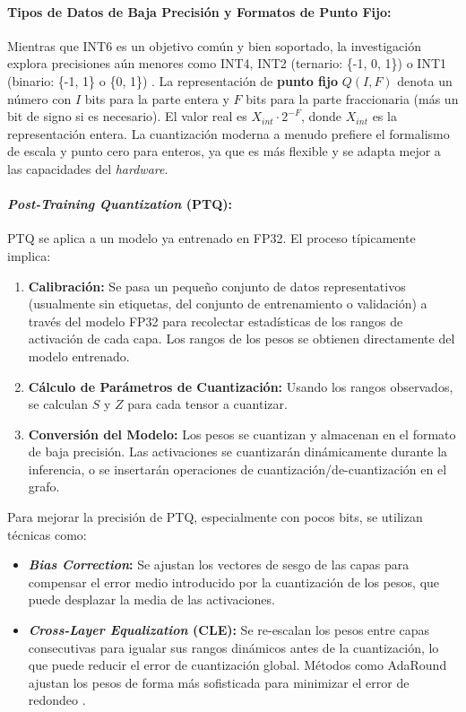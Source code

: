 \documentclass[12pt]{article}
\begin{document}
\paragraph{Tipos de Datos de Baja Precisión y Formatos de Punto Fijo:}
Mientras que INT6 es un objetivo común y bien soportado, la investigación explora precisiones aún menores como INT4, INT2 (ternario: \{-1, 0, 1\}) o INT1 (binario: \{-1, 1\} o \{0, 1\}) \cite{LiX2021RobustnessAware}. La representación de \textbf{punto fijo} $Q(I,F)$ denota un número con $I$ bits para la parte entera y $F$ bits para la parte fraccionaria (más un bit de signo si es necesario). El valor real es $X_{int} \cdot 2^{-F}$, donde $X_{int}$ es la representación entera. La cuantización moderna a menudo prefiere el formalismo de escala y punto cero para enteros, ya que es más flexible y se adapta mejor a las capacidades del \textit{hardware}.

\paragraph{\textit{Post-Training Quantization} (PTQ):}
PTQ se aplica a un modelo ya entrenado en FP32. El proceso típicamente implica:
\begin{enumerate}
    \item \textbf{Calibración:} Se pasa un pequeño conjunto de datos representativos (usualmente sin etiquetas, del conjunto de entrenamiento o validación) a través del modelo FP32 para recolectar estadísticas de los rangos de activación de cada capa. Los rangos de los pesos se obtienen directamente del modelo entrenado.
    \item \textbf{Cálculo de Parámetros de Cuantización:} Usando los rangos observados, se calculan $S$ y $Z$ para cada tensor a cuantizar.
    \item \textbf{Conversión del Modelo:} Los pesos se cuantizan y almacenan en el formato de baja precisión. Las activaciones se cuantizarán dinámicamente durante la inferencia, o se insertarán operaciones de cuantización/de-cuantización en el grafo.
\end{enumerate}
Para mejorar la precisión de PTQ, especialmente con pocos bits, se utilizan técnicas como:
\begin{itemize}
    \item \textbf{\textit{Bias Correction}:} Se ajustan los vectores de sesgo de las capas para compensar el error medio introducido por la cuantización de los pesos, que puede desplazar la media de las activaciones.
    \item \textbf{\textit{Cross-Layer Equalization} (CLE):} Se re-escalan los pesos entre capas consecutivas para igualar sus rangos dinámicos antes de la cuantización, lo que puede reducir el error de cuantización global. Métodos como AdaRound ajustan los pesos de forma más sofisticada para minimizar el error de redondeo \cite{Liang2021PruningSurvey, Rezk2022MOHAQ}.
\end{itemize}
\end{document}
